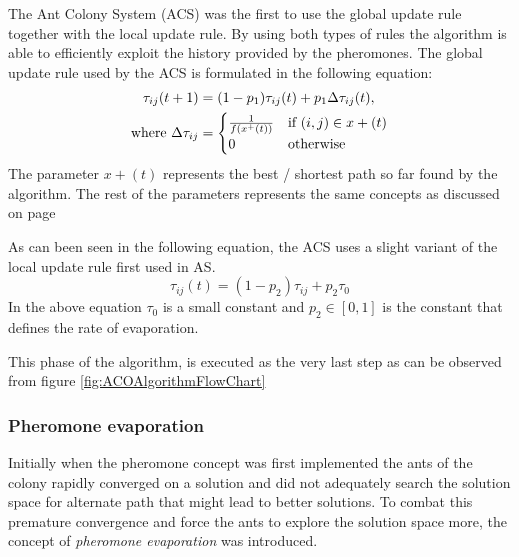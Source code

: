 The Ant Colony System (ACS) was the first to use the global update rule together with the local update rule\cite{CompuIntelligenceIntro}. By using both types of rules the algorithm is able to efficiently exploit the history provided by the pheromones\cite{CompuIntelligenceIntro}. The global update rule used by the ACS is formulated in the following equation\cite{CompuIntelligenceIntro}:
\begin{align}
\label{eq:pheromoneupdate}
	\tau_{ij}(t + 1) &= (1 - p_1)\tau_{ij}(t) + p_1\Delta\tau_{ij}(t),\\
	\text{where }\Delta\tau_{ij} &= \notag
	\begin{cases}
		\frac{1}{f(x^+(t))} &\text{if $(i,j) \in x+(t)$}\\
		0 &\text{otherwise}
	\end{cases}
\end{align}
The parameter $x+(t)$ represents the best / shortest path so far found by the algorithm\cite{CompuIntelligenceIntro}. The rest of the parameters represents the same concepts as discussed on page \pageref{eq:ASprobability}

As can been seen in the following equation, the ACS uses a slight variant of the local update rule first used in AS\cite{CompuIntelligenceIntro}.
\begin{equation}
	\tau_{ij}(t) = (1 - p_2)\tau_{ij} + p_2\tau_0
\end{equation}
In the above equation $\tau_0$ is a small constant and $p_2 \in [0,1]$ is the constant that defines the rate of evaporation\cite{CompuIntelligenceIntro}.

This phase of the algorithm, is executed as the very last step as can be observed from figure \ref{fig:ACOAlgorithmFlowChart}

\subsubsection{Pheromone evaporation}
\label{sec:pheromoneevapuation}
Initially when the pheromone concept was first implemented the ants of the colony rapidly converged on a solution and did not adequately search the solution space for alternate path that might lead to better solutions. To combat this premature convergence and force the ants to explore the solution space more, the concept of \emph{pheromone evaporation} was introduced\cite{CompuIntelligenceIntro,AntsAndStigmergy,AntIntroTrends,AntSurvey}. 

